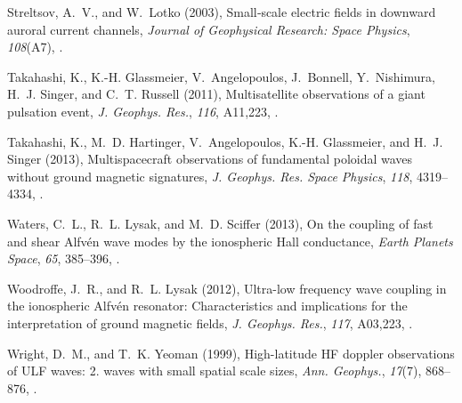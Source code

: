 \documentclass[draft,linenumbers]{agujournal}
\begin{document}
\begin{thebibliography}{62}
Streltsov, A.~V., and W.~Lotko (2003), Small‐scale electric fields in
  downward auroral current channels, \textit{Journal of Geophysical Research:
  Space Physics}, \textit{108}(A7), .

Takahashi, K., K.-H. Glassmeier, V.~Angelopoulos, J.~Bonnell, Y.~Nishimura,
  H.~J. Singer, and C.~T. Russell (2011), Multisatellite observations of a
  giant pulsation event, \textit{J. Geophys. Res.}, \textit{116}, A11,223,
  .

Takahashi, K., M.~D. Hartinger, V.~Angelopoulos, K.-H. Glassmeier, and H.~J.
  Singer (2013), Multispacecraft observations of fundamental poloidal waves
  without ground magnetic signatures, \textit{J. Geophys. Res. Space Physics},
  \textit{118}, 4319--4334, .

Waters, C.~L., R.~L. Lysak, and M.~D. Sciffer (2013), On the coupling of fast
  and shear {Alfv{\'e}n} wave modes by the ionospheric {Hall} conductance,
  \textit{Earth Planets Space}, \textit{65}, 385--396,
  .

Woodroffe, J.~R., and R.~L. Lysak (2012), Ultra-low frequency wave coupling in
  the ionospheric {Alfv{\'e}n} resonator: Characteristics and implications for
  the interpretation of ground magnetic fields, \textit{J. Geophys. Res.},
  \textit{117}, A03,223, .

Wright, D.~M., and T.~K. Yeoman (1999), High-latitude {HF} doppler observations
  of {ULF} waves: 2. waves with small spatial scale sizes, \textit{Ann.
  Geophys.}, \textit{17}(7), 868--876, .


\end{thebibliography}
\end{document}
